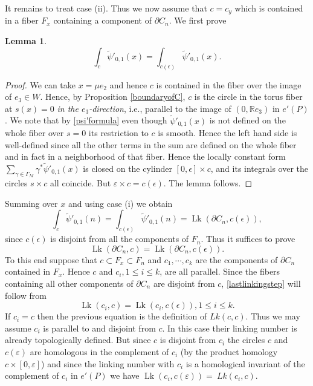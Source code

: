 \documentclass[12pt,leqno]{amsart}
\numberwithin{equation}{section}
\theoremstyle{plain}
\newtheorem{lemma}[theorem]{Lemma}
\theoremstyle{definition}
\theoremstyle{remark}
\newcommand{\R}{\mathbb{R}}
\newcommand{\eps}{\varepsilon}
\newcommand{\Lk}{\operatorname{Lk}}
\begin{document}
It remains to treat case (ii). 
Thus we now assume that $c=c_y$ which is contained in a fiber $F_x$ containing a component  of $\partial C_n$.  We first prove
\begin{lemma}\label{selflinkingforx}
\[
\int_{c} \widetilde{\psi}'_{0,1}(x) =
\int_{c(\epsilon)}  \widetilde{\psi}'_{0,1}(x).
\]
\end{lemma}
\begin{proof} 
We can take $x = \mu e_2$ and hence $c$ is contained in the fiber over the image of $e_3 \in W$. Hence, by Proposition \ref{boundaryofC}, $c $ is the circle in the torus fiber at $s(x )=0$ {\it in the $e_3$-direction}, i.e., parallel to the image of $(0,\R e_3)$ in $e'(P)$. We note that by \eqref{psi'formula} even though $\widetilde{\psi}'_{0,1}(x)$ is not defined on the whole fiber over $s=0$ its restriction to $c$ is smooth. Hence the left hand side is well-defined since all the other terms in the sum are defined on the whole fiber and in fact in a neighborhood of that fiber. Hence the locally constant form $\sum_{\gamma \in \Gamma_M} \gamma^* \widetilde{\psi}'_{0,1}(x)$ is closed on the cylinder $[0, \epsilon] \times c $, and its integrals over the circles $s \times c $ all coincide. But $ \eps \times c = c(\epsilon)$. The lemma follows.
\end{proof}
Summing over $x$ and using case (i) we obtain 
\[
\int_{c} \widetilde{\psi}'_{0,1}(n) =\int_{c(\epsilon)}  \widetilde{\psi}'_{0,1}(n) = \Lk(\partial C_n ,c(\epsilon)),
\]
since $c(\epsilon)$ is disjoint from all the components of $F_n$. Thus it suffices to prove 
\begin{equation}\label{lastlinkingstep}
\Lk(\partial C_n, c) = \Lk(\partial C_n, c(\epsilon)).
\end{equation}
To this end suppose that $c \subset F_x \subset F_n$ and $c_1,\cdots,c_k$ are the components of $\partial C_n$ contained in $F_x$. Hence
$c$ and $c_i,1 \leq i \leq k$, are all parallel. Since the fibers containing all other components of $\partial C_n$ are disjoint from $c$, \eqref{lastlinkingstep} will follow from
\[
\Lk(c_i,c) = \Lk(c_i, c(\epsilon)), 1 \leq i \leq k.
\]
If $c_i = c$ then the previous equation is the definition of $Lk(c,c)$. Thus we may assume $c_i$ is parallel to and disjoint from $c$. 
In this case their linking number is already topologically defined.
But since $c$ is disjoint from $c_i$ the circles $c$ and $c(\eps)$ are homologous in the complement of $c_i$ (by the product homology $c \times [0,\eps]$) and since the linking number with $c_i$ is a homological invariant of the complement of $c_i$ in $e'(P)$ we have 
$\Lk(c_i, c(\eps)) =\ Lk(c_i, c)$.
\end{document}
